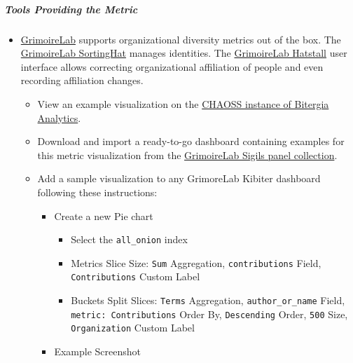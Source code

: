 \hypertarget{tools-providing-the-metric}{%
\subparagraph{Tools Providing the
Metric}\label{tools-providing-the-metric}}

\begin{itemize}
\item
  \href{https://chaoss.github.io/grimoirelab}{GrimoireLab} supports
  organizational diversity metrics out of the box. The
  \href{https://github.com/chaoss/grimoirelab-sortinghat}{GrimoireLab
  SortingHat} manages identities. The
  \href{https://github.com/chaoss/grimoirelab-hatstall}{GrimoireLab
  Hatstall} user interface allows correcting organizational affiliation
  of people and even recording affiliation changes.

  \begin{itemize}
  \item
    View an example visualization on the
    \href{https://chaoss.biterg.io/app/kibana\#/dashboard/Community-Structure-by-Organization}{CHAOSS
    instance of Bitergia Analytics}.
  \item
    Download and import a ready-to-go dashboard containing examples for
    this metric visualization from the
    \href{https://chaoss.github.io/grimoirelab-sigils/panels/community-structure-by-organization/}{GrimoireLab
    Sigils panel collection}.
  \item
    Add a sample visualization to any GrimoreLab Kibiter dashboard
    following these instructions:

    \begin{itemize}
    \tightlist
    \item
      Create a new Pie chart

      \begin{itemize}
      \tightlist
      \item
        Select the \texttt{all\_onion} index
      \item
        Metrics Slice Size: \texttt{Sum} Aggregation,
        \texttt{contributions} Field, \texttt{Contributions} Custom
        Label
      \item
        Buckets Split Slices: \texttt{Terms} Aggregation,
        \texttt{author\_or\_name} Field, \texttt{metric:\ Contributions}
        Order By, \texttt{Descending} Order, \texttt{500} Size,
        \texttt{Organization} Custom Label
      \end{itemize}
    \item
      Example Screenshot
    \end{itemize}


\end{itemize}
\end{itemize}
